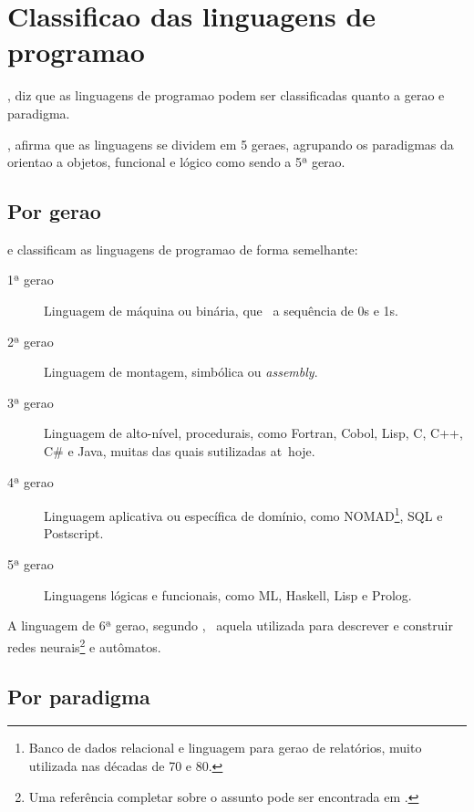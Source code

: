 
\section{Classifica\ca o das linguagens de programa\ca o}
\label{revisao:classificacao}

\cite{Aho08}, diz que as linguagens de programa\ca o podem ser classificadas quanto a gera\ca o e paradigma.

\cite{MacLennan}, afirma que as linguagens se dividem em 5 gera\co es, agrupando os paradigmas da orienta\ca o a objetos, funcional e l\'ogico como sendo a 5ª gera\ca o.

\subsection{Por gera\ca o}

\cite{Aho08} e \cite{wiki:lingprog} classificam as linguagens de programa\ca o de forma semelhante:

\begin{description}
\item[1ª gera\ca o] Linguagem de m\'aquina ou bin\'aria, que \eh\ a sequ\^encia de 0s e 1s.
\item[2ª gera\ca o] Linguagem de montagem, simb\'olica ou \emph{assembly}.
\item[3ª gera\ca o] Linguagem de alto-n\'ivel, procedurais, como Fortran, Cobol, Lisp, C, C++, C\# e Java, muitas das quais s\ao utilizadas at\eh\ hoje.
\item[4ª gera\ca o] Linguagem aplicativa ou espec\'ifica de dom\'inio, como NOMAD\footnote{Banco de dados relacional e linguagem para gera\ca o de relat\'orios, muito utilizada nas d\'ecadas de 70 e 80.}, SQL e Postscript.
\item[5ª gera\ca o] Linguagens l\'ogicas e funcionais, como ML, Haskell, Lisp e Prolog.
\end{description}

A linguagem de 6ª gera\ca o, segundo \cite{wiki:lingprog}, \eh\ aquela utilizada para descrever e construir redes neurais\footnote{Uma refer\^encia completar sobre o assunto pode ser encontrada em \cite{wiki:redesneurais}.} e aut\^omatos.

\subsection{Por paradigma}

